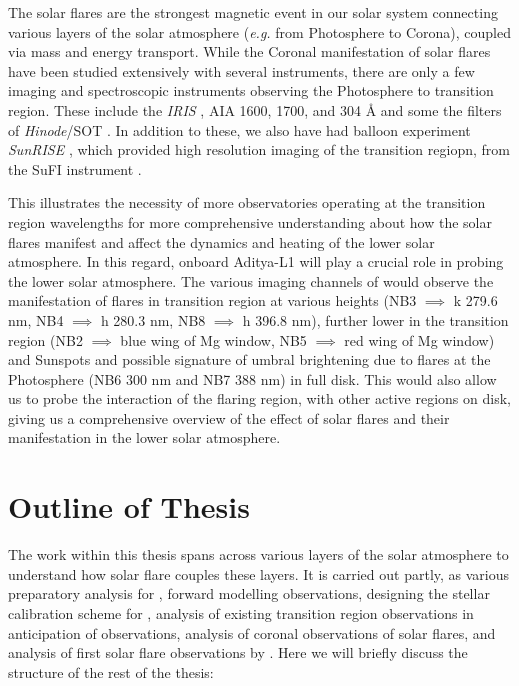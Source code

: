 The solar flares are the strongest magnetic event in our solar system connecting various layers of the solar atmosphere ({\it e.g.} from Photosphere to Corona), coupled via mass and energy transport. While the Coronal manifestation of solar flares have been studied extensively with several instruments, there are only a few imaging and spectroscopic instruments observing the Photosphere to transition region. These include the {\it IRIS} \citep{iris}, AIA 1600, 1700, and 304  {\AA} \citep{aia} and some the filters of {\it Hinode}/SOT \citep{sot}. In addition to these, we also have had balloon experiment {\it SunRISE} \citep{Sunrise1,Sunrise2}, which provided high resolution imaging of the transition regiopn, from the SuFI instrument \citep{sufi}.

This illustrates the necessity of more observatories operating at the transition region wavelengths for more comprehensive understanding about how the solar flares manifest and affect the dynamics and heating of the lower solar atmosphere. In this regard, {\suit} onboard Aditya-L1 will play a crucial role in probing the lower solar atmosphere. The various imaging channels of {\suit} would observe the manifestation of flares in transition region at various heights (NB3 $\implies$  k 279.6 nm, NB4 $\implies$  h 280.3 nm, NB8 $\implies$  h 396.8 nm), further lower in the transition region (NB2 $\implies$ blue wing of Mg window, NB5 $\implies$ red wing of Mg window) and Sunspots and possible signature of umbral brightening due to flares at the Photosphere (NB6 300 nm and NB7 388 nm) in full disk. This would also allow us to probe the interaction of the flaring region, with other active regions on disk, giving us a comprehensive overview of the effect of solar flares and their manifestation in the lower solar atmosphere.

\section{Outline of Thesis}\label{sec:outline}

The work within this thesis spans across various layers of the solar atmosphere to understand how solar flare couples these layers. It is carried out partly, as various preparatory analysis for {\suit}, forward modelling {\suit} observations, designing the stellar calibration scheme for {\suit}, analysis of existing transition region observations in anticipation of {\suit} observations, analysis of coronal observations of solar flares, and analysis of first solar flare observations by {\suit}. Here we will briefly discuss the structure of the rest of the thesis:


